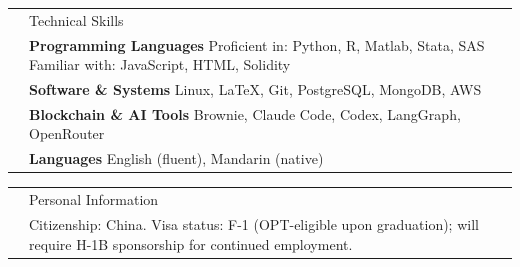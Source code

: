 \documentclass[letterpaper, 11pt]{article}
\newcommand{\headingfont}{\Large\color{OliveGreen}}
\newenvironment{SectionTable}[1]{
	\renewcommand*{\arraystretch}{1.55}
	\setlength{\tabcolsep}{10pt}
	\begin{longtable}{Rp{5.45in}} & #1 \\}
{\end{longtable}\vspace{-.3cm}}
\newenvironment{SectionTableSingleSpace}[1]{
	\renewcommand*{\arraystretch}{1.15}
	\setlength{\tabcolsep}{10pt}
	\begin{longtable}{Rp{5.45in}} & #1 \\[0.6em]}
{\end{longtable}\vspace{-.3cm}}
\begin{document}



\begin{SectionTableSingleSpace}{\headingfont Technical Skills}
& \textbf{Programming Languages} \newline
Proficient in: Python, R, Matlab, Stata, SAS \newline
Familiar with: JavaScript, HTML, Solidity \\

& \textbf{Software \& Systems} \newline
Linux, \LaTeX, Git, PostgreSQL, MongoDB, AWS \\

& \textbf{Blockchain \& AI Tools} \newline
Brownie, Claude Code, Codex, LangGraph, OpenRouter \\

& \textbf{Languages} \newline
English (fluent), Mandarin (native)
\end{SectionTableSingleSpace}


\begin{SectionTableSingleSpace}{\headingfont Personal Information}
& Citizenship: China. Visa status: F-1 (OPT-eligible upon graduation); will require H-1B sponsorship for continued employment.
\end{SectionTableSingleSpace}

\end{document}
